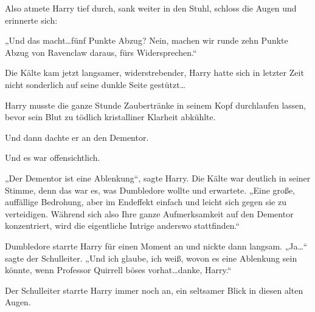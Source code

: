 Also atmete Harry tief durch, sank weiter in den Stuhl, schloss die Augen und erinnerte sich:

„Und das macht…fünf Punkte Abzug? Nein, machen wir runde zehn Punkte Abzug von Ravenclaw daraus, fürs Widersprechen.“

Die Kälte kam jetzt langsamer, widerstrebender, Harry hatte sich in letzter Zeit nicht sonderlich auf seine dunkle Seite gestützt…

Harry musste die ganze Stunde Zaubertränke in seinem Kopf durchlaufen lassen, bevor sein Blut zu tödlich kristalliner Klarheit abkühlte.

Und dann dachte er an den Dementor.

Und es war offensichtlich.

„Der Dementor ist eine Ablenkung“, sagte Harry. Die Kälte war deutlich in seiner Stimme, denn das war es, was Dumbledore wollte und erwartete. „Eine große, auffällige Bedrohung, aber im Endeffekt einfach und leicht sich gegen sie zu verteidigen. Während sich also Ihre ganze Aufmerksamkeit auf den Dementor konzentriert, wird die eigentliche Intrige anderswo stattfinden.“

Dumbledore starrte Harry für einen Moment an und nickte dann langsam. „Ja…“ sagte der Schulleiter. „Und ich glaube, ich weiß, wovon es eine Ablenkung sein könnte, wenn Professor Quirrell böses vorhat…danke, Harry.“

Der Schulleiter starrte Harry immer noch an, ein seltsamer Blick in diesen alten Augen.

